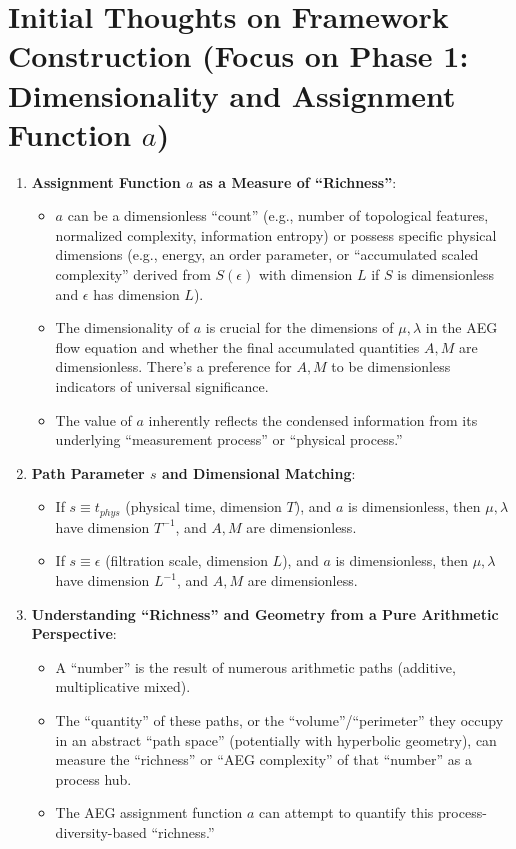 \documentclass[12pt]{article}
\begin{document}
\section{Initial Thoughts on Framework Construction (Focus on Phase 1: Dimensionality and Assignment Function $a$)}

\begin{enumerate}
    \item \textbf{Assignment Function $a$ as a Measure of ``Richness''}:
    \begin{itemize}
        \item $a$ can be a dimensionless ``count'' (e.g., number of topological features, normalized complexity, information entropy) or possess specific physical dimensions (e.g., energy, an order parameter, or ``accumulated scaled complexity'' derived from $S(\epsilon)$ with dimension $L$ if $S$ is dimensionless and $\epsilon$ has dimension $L$).
        \item The dimensionality of $a$ is crucial for the dimensions of $\mu, \lambda$ in the AEG flow equation and whether the final accumulated quantities $A, M$ are dimensionless. There's a preference for $A,M$ to be dimensionless indicators of universal significance.
        \item The value of $a$ inherently reflects the condensed information from its underlying ``measurement process'' or ``physical process.''
    \end{itemize}

    \item \textbf{Path Parameter $s$ and Dimensional Matching}:
    \begin{itemize}
        \item If $s \equiv t_{phys}$ (physical time, dimension $T$), and $a$ is dimensionless, then $\mu, \lambda$ have dimension $T^{-1}$, and $A, M$ are dimensionless.
        \item If $s \equiv \epsilon$ (filtration scale, dimension $L$), and $a$ is dimensionless, then $\mu, \lambda$ have dimension $L^{-1}$, and $A, M$ are dimensionless.
    \end{itemize}

    \item \textbf{Understanding ``Richness'' and Geometry from a Pure Arithmetic Perspective}:
    \begin{itemize}
        \item A ``number'' is the result of numerous arithmetic paths (additive, multiplicative mixed).
        \item The ``quantity'' of these paths, or the ``volume''/``perimeter'' they occupy in an abstract ``path space'' (potentially with hyperbolic geometry), can measure the ``richness'' or ``AEG complexity'' of that ``number'' as a process hub.
        \item The AEG assignment function $a$ can attempt to quantify this process-diversity-based ``richness.''
    \end{itemize}
\end{enumerate}
\end{document}
